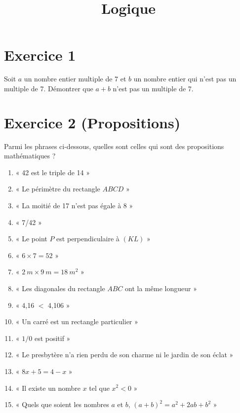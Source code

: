 \documentclass[12pt,a4paper]{article}
\title{Logique}
\author{}
\date{}
\begin{document}
\maketitle

\section*{Exercice 1}
Soit $a$ un nombre entier multiple de 7 et $b$ un nombre entier qui n’est pas un multiple de 7.  
Démontrer que $a+b$ n’est pas un multiple de 7.

\section*{Exercice 2 (Propositions)}
Parmi les phrases ci-dessous, quelles sont celles qui sont des propositions mathématiques ?
\begin{enumerate}
\item « 42 est le triple de 14 »
\item « Le périmètre du rectangle $ABCD$ »
\item « La moitié de 17 n’est pas égale à 8 »
\item « 7/42 »
\item « Le point $P$ est perpendiculaire à $(KL)$ »
\item « $6 \times 7 = 52$ »
\item « $2~m \times 9~m = 18~m^2$ »
\item « Les diagonales du rectangle $ABC$ ont la même longueur »
\item « 4,16 $<$ 4,106 »
\item « Un carré est un rectangle particulier »
\item « $1/0$ est positif »
\item « Le presbytère n’a rien perdu de son charme ni le jardin de son éclat »
\item « $8x+5=4-x$ »
\item « Il existe un nombre $x$ tel que $x^2<0$ »
\item « Quels que soient les nombres $a$ et $b$, $(a+b)^2=a^2+2ab+b^2$ »
\end{enumerate}
\end{document}
